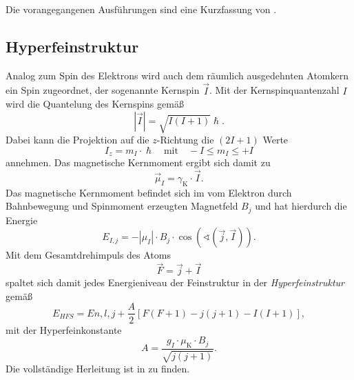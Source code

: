 \documentclass[../bericht.tex]{subfiles}
\begin{document}
        Die vorangegangenen Ausführungen sind eine Kurzfassung von \cite{dem:exp3-feinstruktur}.


      \subsection{Hyperfeinstruktur}
      \label{subsec:hyperfeinstruktur}

        Analog zum Spin des Elektrons wird auch dem räumlich ausgedehnten Atomkern ein Spin zugeordnet, der sogenannte Kernspin $\vec{I}$. Mit der Kernspinquantenzahl $I$ wird die Quantelung des Kernspins gemä\ss
        \begin{equation*}
          |\vec{I}|=\sqrt{I(I+1)}\hslash.
        \end{equation*}
        Dabei kann die Projektion auf die $z$-Richtung die $(2I+1)$ Werte
        \begin{equation*}
          I_z=m_I\cdot \hslash \quad \text{mit}\quad -I\le m_I \le +I
        \end{equation*}
        annehmen. Das magnetische Kernmoment ergibt sich damit zu
        \begin{equation*}
          \vec{\mu}_I=\gamma_\mathrm{K}\cdot \vec{I}.
        \end{equation*}
        Das magnetische Kernmoment befindet sich im vom Elektron durch Bahnbewegung und Spinmoment erzeugten Magnetfeld $B_j$ und hat hierdurch die Energie
        \begin{equation*}
          E_{I,j}=-|\mu_I|\cdot B_j \cdot \cos \left( \sphericalangle \left( \vec{j}, \vec{I}\right) \right).
        \end{equation*}
        Mit dem Gesamtdrehimpuls des Atoms
        \begin{equation*}
          \vec{F} = \vec{j}+\vec{I}
        \end{equation*}
        spaltet sich damit jedes Energieniveau der Feinstruktur in der \textit{Hyperfeinstruktur} gemä\ss
        \begin{equation}
          E_{HFS}=E{n,l,j} + \frac{A}{2}\left[ F(F+1) - j(j+1) - I(I+1) \right],
        \end{equation}
        mit der Hyperfeinkonstante
        \begin{equation*}
          A=\frac{g_I \cdot \mu_\mathrm{K}\cdot B_j}{\sqrt{j(j+1)}}.
        \end{equation*}
        Die vollständige Herleitung ist in \cite{dem:exp3-hyperfeinstruktur} zu finden.
\end{document}
